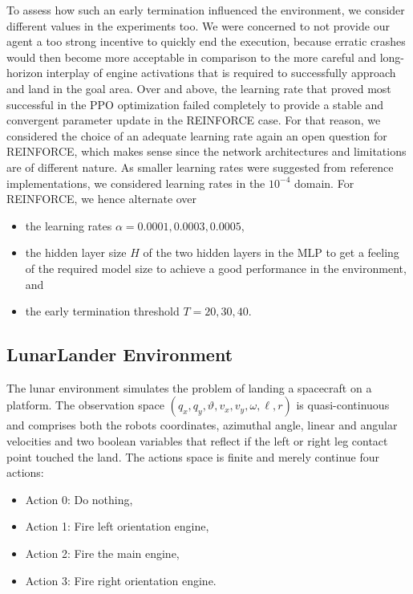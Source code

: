 \documentclass[a4paper, 11pt]{article}
\begin{document}
	To assess how such an early termination influenced the environment, we consider different values in the experiments too. We were concerned to not provide our agent a too strong incentive to quickly end the execution, because erratic crashes would then become more acceptable in comparison to the more careful and long-horizon interplay of engine activations that is required to successfully approach and land in the goal area.
	Over and above, the learning rate that proved most successful in the PPO optimization failed completely to provide a stable and convergent parameter update in the REINFORCE case. For that reason, we considered the choice of an adequate learning rate again an open question for REINFORCE, which makes sense since the network architectures and limitations are of different nature.
	As smaller learning rates were suggested from reference implementations, we considered learning rates in the $10^{-4}$ domain.
	For REINFORCE, we hence alternate over
	\begin{itemize}
		\item the learning rates $\alpha=0.0001,0.0003,0.0005$,
		\item the hidden layer size $H$ of the two hidden layers in the MLP to get a feeling of the required model size to achieve a good performance in the environment, and
		\item the early termination threshold $T=20,30,40$.
	\end{itemize}
	\subsection{LunarLander Environment}
	The lunar environment simulates the problem of landing a spacecraft on a platform. The observation space $(q_x,q_y,\vartheta,v_x,v_y,\omega,\ell,r)$ is quasi-continuous and comprises both the robots coordinates, azimuthal angle, linear and angular velocities and two boolean variables that reflect if the left or right leg contact point touched the land.
	The actions space is finite and merely continue four actions:
	\begin{itemize}
		\item Action 0: Do nothing,
		\item Action 1: Fire left orientation engine,
		\item Action 2: Fire the main engine,
		\item Action 3: Fire right orientation engine.
	\end{itemize}
	
\end{document}
